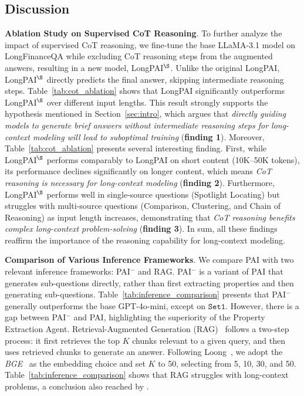 \subsection{Discussion}
\noindent \textbf{Ablation Study on Supervised CoT Reasoning}. 
To further analyze the impact of supervised CoT reasoning, we fine-tune the base LLaMA-3.1 model on LongFinanceQA while excluding CoT reasoning steps from the augmented answers, resulting in a new model, LongPAI$^{\S}$.
Unlike the original LongPAI, LongPAI$^{\S}$ directly predicts the final answer, skipping intermediate reasoning steps.
Table~\ref{tab:cot_ablation} shows that LongPAI significantly outperforms LongPAI$^{\S}$ over different input lengths. This result strongly supports the hypothesis mentioned in Section~\ref{sec:intro}, which argues that \emph{directly guiding models to generate brief answers without intermediate reasoning steps for long-context modeling will lead to suboptimal training} (\textbf{finding 1}).
Moreover, Table~\ref{tab:cot_ablation} presents several interesting finding.
First, while LongPAI$^{\S}$ performs comparably to LongPAI on short content (10K–50K tokens), its performance declines significantly on longer content, which means \emph{CoT reasoning is necessary for long-context modeling} (\textbf{finding 2}). Furthermore, LongPAI$^{\S}$ performs well in single-source questions (Spotlight Locating) but struggles with multi-source questions (Comparison, Clustering, and Chain of Reasoning) as input length increases, demonstrating that \emph{CoT reasoning benefits complex long-context problem-solving} (\textbf{finding 3}). In sum, all these findings reaffirm the importance of the reasoning capability for long-context modeling.

\noindent \textbf{Comparison of Various Inference Frameworks}. We compare PAI with two relevant inference frameworks: PAI$^-$ and RAG.
PAI$^-$ is a variant of PAI that generates sub-questions directly, rather than first extracting properties and then generating sub-questions.
Table~\ref{tab:inference_comparison} presents that PAI$^-$ generally outperforms the base GPT-4o-mini, except on $\mathtt{Set 1}$. However, there is a gap between PAI$^-$ and PAI, highlighting the superiority of the Property Extraction Agent.
Retrieval-Augmented Generation (RAG)~\cite{lewis2020retrieval} follows a two-step process: it first retrieves the top $K$ chunks relevant to a given query, and then uses retrieved chunks to generate an answer. Following Loong~\cite{wang2024leave}, we adopt the \textit{BGE}~\cite{chen-etal-2024-m3} as the embedding choice and set $K$ to 50, selecting from 5, 10, 30, and 50. Table~\ref{tab:inference_comparison} shows that RAG struggles with long-context problems, a conclusion also reached by \cite{wang2024leave}.


